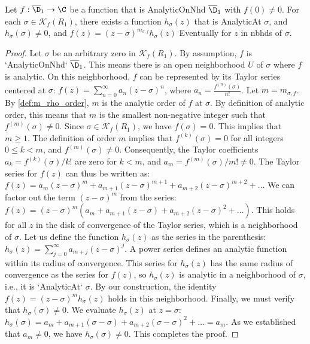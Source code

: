\begin{lemma}\label{lem:analytic_zero_factor} \leanok {}
Let $f:\overline{\D}_1\to\C$ be a function that is AnalyticOnNhd $\overline{\D}_1$ with $f(0)\neq0$. For each $\sigma \in \mathcal{K}_f(R_1)$, there exists a function $h_\sigma(z)$ that is AnalyticAt $\sigma$, and $h_\sigma(\sigma) \neq 0$, and $f(z) = (z-\sigma)^{m_{\sigma,f}} h_\sigma(z)$ Eventually for $z$ in nbhds of $\sigma$.
\end{lemma}
\begin{proof}
\leanok
Let $\sigma$ be an arbitrary zero in $\mathcal{K}_f(R_1)$.
By assumption, $f$ is `AnalyticOnNhd` $\overline{\D}_1$. This means there is an open neighborhood $U$ of $\sigma$ where $f$ is analytic. On this neighborhood, $f$ can be represented by its Taylor series centered at $\sigma$:
$f(z) = \sum_{n=0}^\infty a_n (z-\sigma)^n$, where $a_n = \frac{f^{(n)}(\sigma)}{n!}$.
Let $m = m_{\sigma,f}$. By \cref{def:m_rho_order}, $m$ is the analytic order of $f$ at $\sigma$. By definition of analytic order, this means that $m$ is the smallest non-negative integer such that $f^{(m)}(\sigma) \neq 0$.
Since $\sigma \in \mathcal{K}_f(R_1)$, we have $f(\sigma)=0$. This implies that $m \ge 1$.
The definition of order $m$ implies that $f^{(k)}(\sigma) = 0$ for all integers $0 \le k < m$, and $f^{(m)}(\sigma) \neq 0$.
Consequently, the Taylor coefficients $a_k = f^{(k)}(\sigma)/k!$ are zero for $k < m$, and $a_m = f^{(m)}(\sigma)/m! \neq 0$.
The Taylor series for $f(z)$ can thus be written as:
$f(z) = a_m(z-\sigma)^m + a_{m+1}(z-\sigma)^{m+1} + a_{m+2}(z-\sigma)^{m+2} + \dots$
We can factor out the term $(z-\sigma)^m$ from the series:
$f(z) = (z-\sigma)^m \left( a_m + a_{m+1}(z-\sigma) + a_{m+2}(z-\sigma)^2 + \dots \right)$.
This holds for all $z$ in the disk of convergence of the Taylor series, which is a neighborhood of $\sigma$.
Let us define the function $h_\sigma(z)$ as the series in the parenthesis:
$h_\sigma(z) = \sum_{j=0}^\infty a_{m+j} (z-\sigma)^j$.
A power series defines an analytic function within its radius of convergence. This series for $h_\sigma(z)$ has the same radius of convergence as the series for $f(z)$, so $h_\sigma(z)$ is analytic in a neighborhood of $\sigma$, i.e., it is `AnalyticAt` $\sigma$.
By our construction, the identity $f(z) = (z-\sigma)^m h_\sigma(z)$ holds in this neighborhood.
Finally, we must verify that $h_\sigma(\sigma) \neq 0$. We evaluate $h_\sigma(z)$ at $z=\sigma$:
$h_\sigma(\sigma) = a_m + a_{m+1}(\sigma-\sigma) + a_{m+2}(\sigma-\sigma)^2 + \dots = a_m$.
As we established that $a_m \neq 0$, we have $h_\sigma(\sigma) \neq 0$. This completes the proof.
\end{proof}

